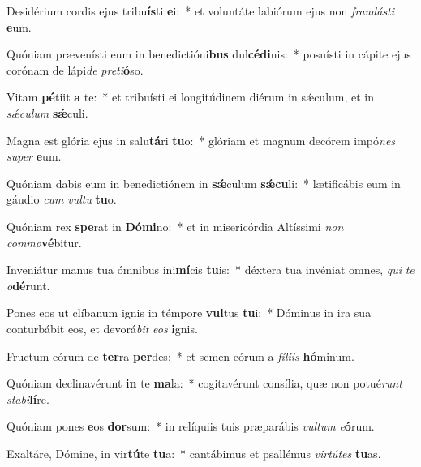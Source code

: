 \item Desidérium cordis ejus tribu\textbf{ís}ti \textbf{e}i:~* et voluntáte labiórum ejus non \textit{frau}\textit{dás}\textit{ti} \textbf{e}um.
\item Quóniam prævenísti eum in benedictióni\textbf{bus} dul\textbf{cé}\textbf{di}nis:~* posuísti in cápite ejus corónam de lápi\textit{de} \textit{pre}\textit{ti}\textbf{ó}so.
\item Vitam \textbf{pé}tiit \textbf{a} te:~* et tribuísti ei longitúdinem diérum in sǽculum, et in \textit{sǽ}\textit{cu}\textit{lum} \textbf{sǽ}culi.
\item Magna est glória ejus in salu\textbf{tá}ri \textbf{tu}o:~* glóriam et magnum decórem impó\textit{nes} \textit{su}\textit{per} \textbf{e}um.
\item Quóniam dabis eum in benedictiónem in \textbf{sǽ}culum \textbf{sǽ}\textbf{cu}li:~* lætificábis eum in gáudio \textit{cum} \textit{vul}\textit{tu} \textbf{tu}o.
\item Quóniam rex \textbf{spe}rat in \textbf{Dó}\textbf{mi}no:~* et in misericórdia Altíssimi \textit{non} \textit{com}\textit{mo}\textbf{vé}bitur.
\item Inveniátur manus tua ómnibus ini\textbf{mí}cis \textbf{tu}is:~* déxtera tua invéniat omnes, \textit{qui} \textit{te} \textit{o}\textbf{dé}runt.
\item Pones eos ut clíbanum ignis in témpore \textbf{vul}tus \textbf{tu}i:~* Dóminus in ira sua conturbábit eos, et devorá\textit{bit} \textit{e}\textit{os} \textbf{i}gnis.
\item Fructum eórum de \textbf{ter}ra \textbf{per}des:~* et semen eórum a \textit{fí}\textit{li}\textit{is} \textbf{hó}minum.
\item Quóniam declinavérunt \textbf{in} te \textbf{ma}la:~* cogitavérunt consília, quæ non potué\textit{runt} \textit{sta}\textit{bi}\textbf{lí}re.
\item Quóniam pones \textbf{e}os \textbf{dor}sum:~* in relíquiis tuis præparábis \textit{vul}\textit{tum} \textit{e}\textbf{ó}rum.
\item Exaltáre, Dómine, in vir\textbf{tú}te \textbf{tu}a:~* cantábimus et psallémus \textit{vir}\textit{tú}\textit{tes} \textbf{tu}as.
